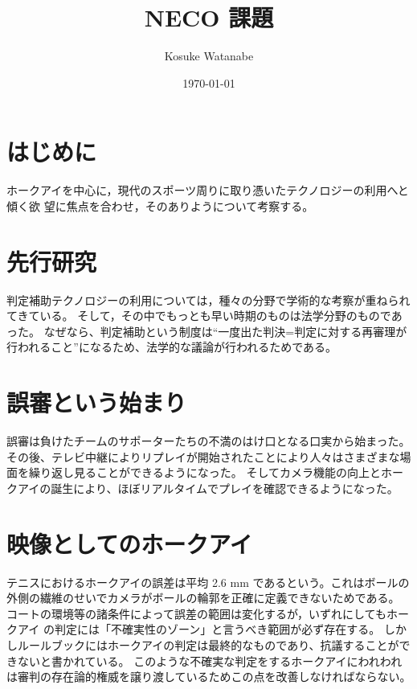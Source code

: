 \documentclass[twocolumn, a4j]{article}
\title{NECO 課題}
\author{Kosuke Watanabe\footnotemark[2]　}
\date{\today}
\renewcommand{\thefootnote}{\fnsymbol{footnote}}
\renewcommand{\thefootnote}{\arabic{footnote}}
\begin{document}

\renewcommand{\thefootnote}{\fnsymbol{footnote}}
\renewcommand{\thefootnote}{\arabic{footnote}}

\section{はじめに}

 ホークアイを中心に，現代のスポーツ周りに取り憑いたテクノロジーの利用へと傾く欲 望に焦点を合わせ，そのありようについて考察する。

\section{先行研究}
判定補助テクノロジーの利用については，種々の分野で学術的な考察が重ねられてきている。 そして，その中でもっとも早い時期のものは法学分野のものであった。
なぜなら、判定補助という制度は“一度出た判決=判定に対する再審理が行われること”になるため、法学的な議論が行われるためである。

\section{誤審という始まり}
誤審は負けたチームのサポーターたちの不満のはけ口となる口実から始まった。
その後、テレビ中継によりリプレイが開始されたことにより人々はさまざまな場面を繰り返し見ることができるようになった。
そしてカメラ機能の向上とホークアイの誕生により、ほぼリアルタイムでプレイを確認できるようになった。

\section{映像としてのホークアイ}
テニスにおけるホークアイの誤差は平均 2.6 mm であるという。これはボールの外側の繊維のせいでカメラがボールの輪郭を正確に定義できないためである。
コートの環境等の諸条件によって誤差の範囲は変化するが，いずれにしてもホークアイ の判定には「不確実性のゾーン」と言うべき範囲が必ず存在する。
しかしルールブックにはホークアイの判定は最終的なものであり、抗議することができないと書かれている。
このような不確実な判定をするホークアイにわれわれは審判の存在論的権威を譲り渡しているためこの点を改善しなければならない。
\end{document}
